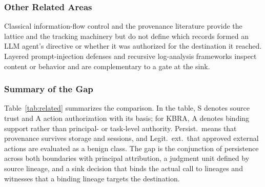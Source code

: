 \documentclass[applsci,article,submit,moreauthors]{Definitions/mdpi}
\begin{document}
\subsubsection{Other Related Areas}
Classical information-flow control \cite{denning1976,sabelfeld2003} and the provenance literature \cite{provsurvey2023,li2021provgraph} provide the lattice and the tracking machinery but do not define which records formed an LLM agent's directive or whether it was authorized for the destination it reached. Layered prompt-injection defenses \cite{spotlight2026} and recursive log-analysis frameworks \cite{logresp2025} inspect content or behavior and are complementary to a gate at the sink.

\subsubsection{Summary of the Gap}
Table~\ref{tab:related} summarizes the comparison. In the table, S denotes source trust and A action authorization with its basis; for KBRA, A denotes binding support rather than principal- or task-level authority. Persist.\ means that provenance survives storage and sessions, and Legit.\ ext.\ that approved external actions are evaluated as a benign class. The gap is the conjunction of persistence across both boundaries with principal attribution, a judgment unit defined by source lineage, and a sink decision that binds the actual call to lineages and witnesses that a binding lineage targets the destination.
\end{document}
